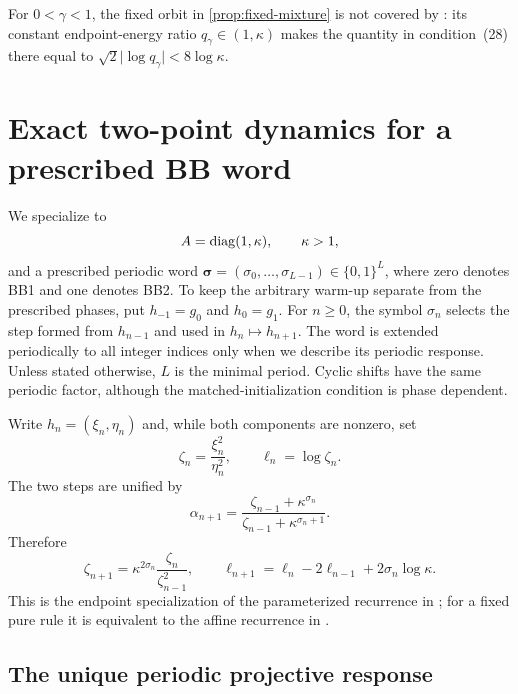 \documentclass[letterpaper,twoside]{article}
\begin{document}
For $0<\gamma<1$, the fixed orbit in \cref{prop:fixed-mixture} is not covered
by \cite[Theorem~2]{DaiHuangLiu2019}: its constant endpoint-energy ratio
$q_\gamma\in(1,\kappa)$ makes the quantity in condition~(28) there equal to
$\sqrt2\lvert\log q_\gamma\rvert<8\log\kappa$.

\section{Exact two-point dynamics for a prescribed BB word}\label{sec:two-point}

We specialize to
\[
 A=\operatorname{diag}(1,\kappa),\qquad \kappa>1,
\]
and a prescribed periodic word
$\bm\sigma=(\sigma_0,\ldots,\sigma_{L-1})\in\{0,1\}^L$, where zero denotes
BB1 and one denotes BB2.  To keep the arbitrary warm-up separate from the
prescribed phases, put $h_{-1}=g_0$ and $h_0=g_1$.  For $n\ge0$, the symbol
$\sigma_n$ selects the step formed from $h_{n-1}$ and used in
$h_n\mapsto h_{n+1}$.  The word is extended periodically to all integer
indices only when we describe its periodic response.  Unless stated
otherwise, $L$ is the minimal period.  Cyclic shifts have the same periodic
factor, although the matched-initialization condition is phase dependent.

Write $h_n=(\xi_n,\eta_n)$ and, while both components are nonzero, set
\begin{equation}\label{eq:zeta}
 \zeta_n=\frac{\xi_n^2}{\eta_n^2},
 \qquad \ell_n=\log\zeta_n.
\end{equation}
The two steps are unified by
\begin{equation}\label{eq:power-step}
 \alpha_{n+1}
 =\frac{\zeta_{n-1}+\kappa^{\sigma_n}}
         {\zeta_{n-1}+\kappa^{\sigma_n+1}}.
\end{equation}
Therefore
\begin{equation}\label{eq:forced-recurrence}
 \zeta_{n+1}
 =\kappa^{2\sigma_n}\frac{\zeta_n}{\zeta_{n-1}^2},
 \qquad
 \ell_{n+1}=\ell_n-2\ell_{n-1}+2\sigma_n\log\kappa.
\end{equation}
This is the endpoint specialization of the parameterized recurrence in
\cite[eqs.~(23)--(26)]{DaiHuangLiu2019}; for a fixed pure rule it is equivalent
to the affine recurrence in \cite{BarzilaiBorwein1988}.

\subsection{The unique periodic projective response}
\end{document}
